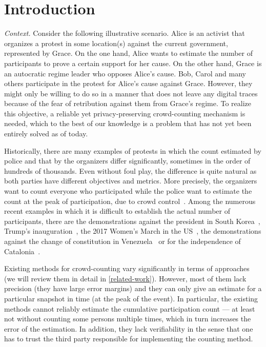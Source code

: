 \section{Introduction}%
\label{Introduction}

\emph{Context.} 
Consider the following illustrative scenario.
Alice is an activist that organizes a protest in some location(s) against the current government, represented by Grace.
On the one hand, Alice wants to estimate the number of participants to prove a certain support for her cause.
On the other hand, Grace is an autocratic regime leader who opposes Alice's cause.
Bob, Carol and many others participate in the protest for Alice's cause against Grace.
However, they might only be willing to do so in a manner that does not leave any digital traces because of the fear of retribution against them from Grace's regime. 
To realize this objective, a reliable yet privacy-preserving crowd-counting mechanism is needed, which to the best of our knowledge is a problem that has not yet been entirely solved as of today.

Historically, there are many examples of protests in which the count estimated by police and that by the organizers differ significantly, sometimes in the order of hundreds of thousands.
Even without foul play, the difference is quite natural as both parties have different objectives and metrics.
More precisely, the organizers want to count everyone who participated while the police want to estimate the count at the peak of participation, due to crowd control~\cite{2016DemonstrationsInSeoul}.
Among the numerous recent examples in which it is difficult to establish the actual number of participants, there are the demonstrations against the president in South Korea~\cite{2016DemonstrationsInSeoul}, Trump's inauguration~\cite{HowWillWeKnowTrumpInauguralCrowdSize}, the 2017 Women's March in the US~\cite{2017WomensMarchesInUS}, the demonstrations against the change of constitution in Venezuela~\cite{AlJazeeraOnVenezuela2017} or for the independence of Catalonia~\cite{CataloniaDemonstrations}.

Existing methods for crowd-counting vary significantly in terms of approaches (we will review them in detail in \cref{related-work}).
However, most of them lack precision (\ie they have large error margins) and they can only give an estimate for a particular snapshot in time (\eg at the peak of the event). 
In particular, the existing methods cannot reliably estimate the cumulative participation count --- at least not without counting some persons multiple times, which in turn increases the error of the estimation.
In addition, they lack verifiability in the sense that one has to trust the third party responsible for implementing the counting method. 

